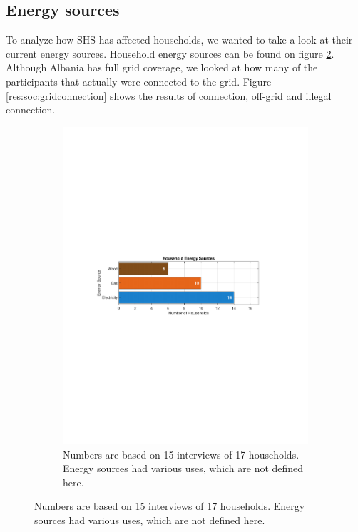 \subsection{Energy sources}
To analyze how SHS has affected households, we wanted to take a look at their current energy sources. Household energy sources can be found on figure \ref{res:soc:householdenergysources}. Although Albania has full grid coverage, we looked at how many of the participants that actually were connected to the grid. Figure \ref{res:soc:gridconnection} shows the results of connection, off-grid and illegal connection.
\begin{figure}[H]
    \centering
    \begin{subfigure}[b]{0.48\textwidth}
        \centering
        \includegraphics[width=\textwidth]{photos/HouseholdEnergySources.pdf}
        \caption{Numbers are based on 15 interviews of 17 households. Energy sources had various uses, which are not defined here.}
        \label{res:soc:householdenergysources}
    \end{subfigure}

\end{figure}

